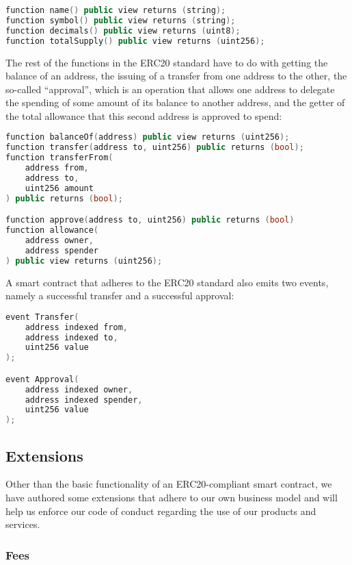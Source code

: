\documentclass[a4paper,12pt]{article}
\begin{document}
\begin{lstlisting}[language=C++, caption=ERC20 Solidity qualitative function signatures.]
function name() public view returns (string);
function symbol() public view returns (string);
function decimals() public view returns (uint8);
function totalSupply() public view returns (uint256);
\end{lstlisting}
The rest of the functions in the ERC20 standard have to do with getting the balance of
an address,
the issuing of a transfer from one address to the other,
the so-called ``approval'', which is an operation that allows one address to delegate
the spending of some amount of its balance to another address, and the getter of the total allowance that this second address is approved to spend:

\begin{lstlisting}[language=C++, caption=ERC20 Solidity operational function signatures.]
function balanceOf(address) public view returns (uint256);
function transfer(address to, uint256) public returns (bool);
function transferFrom(
    address from,
    address to,
    uint256 amount
) public returns (bool);

function approve(address to, uint256) public returns (bool)
function allowance(
    address owner,
    address spender
) public view returns (uint256);
\end{lstlisting}
A smart contract that adheres to the ERC20 standard also emits two events, namely a successful transfer and a successful approval:
\begin{lstlisting}[language=C++, caption=ERC20 Solidity events.]
event Transfer(
    address indexed from,
    address indexed to,
    uint256 value
);

event Approval(
    address indexed owner,
    address indexed spender,
    uint256 value
);
\end{lstlisting}

\subsection{Extensions}
Other than the basic functionality of an ERC20-compliant smart contract, we have authored
some extensions that adhere to our own business model and will help us enforce our code of conduct
regarding the use of our products and services.

\subsubsection{Fees}
\end{document}
